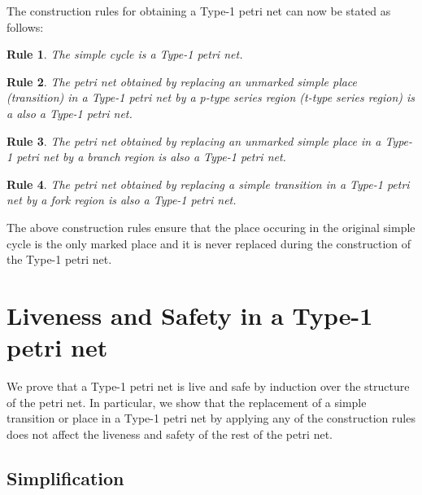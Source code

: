 \documentclass[12pt,a4paper]{article}
\newtheorem{srule}{Rule}
\begin{document}
The construction rules for obtaining a  Type-1 petri net can now be
stated as follows:

\setcounter{srule}{-1}

\begin{srule}
  The simple cycle is a Type-1 petri net.
\end{srule}

\begin{srule}
  The petri net obtained by replacing an unmarked simple place
  (transition) in a Type-1 petri net by a p-type series region (t-type
  series region) is a also a Type-1 petri net.
\end{srule}

\begin{srule}
  The petri net obtained by replacing an unmarked simple place in a
  Type-1 petri net by a branch region is also a Type-1 petri net.
\end{srule}

\begin{srule}
  The petri net obtained by replacing a simple transition in a Type-1
  petri net by a fork region is also a Type-1 petri net.
\end{srule}

The above construction rules ensure that the place occuring in the
original simple cycle is the only marked place and it is never
replaced during the construction of the Type-1 petri net.

\section{Liveness and Safety in a Type-1 petri net}
\label{sec:live-safe}

We prove that a Type-1 petri net is live and safe by induction over
the structure of the petri net. In particular, we show that the
replacement of a simple transition or place in a Type-1 petri net by
applying any of the construction rules does not affect the liveness
and safety of the rest of the petri net.

\subsection{Simplification}
\label{sec:simplification-live-safe}
\end{document}
